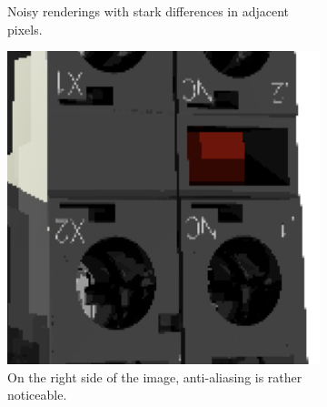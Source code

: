\begin{figure}[H]
\begin{subfigure}[t]{0.3\textwidth}
        \caption{Noisy renderings with stark differences in adjacent pixels.}
        \label{fig:rngNoiseArtifactsHighlightsGoodNoisy}
    \end{subfigure}
    \hspace*{2cm}
    \vfill
    \vspace*{0.5cm}
    \hspace*{2cm}
    \begin{subfigure}[t]{0.3\textwidth}
        \includegraphics[width=\textwidth]{resources/bad-seed-anti-aliasing.png}
        \caption{On the right side of the image, anti-aliasing is rather noticeable.}
        \label{fig:rngNoiseArtifactsHighlightsBadAnti}
    \end{subfigure}
    \hfill
    \begin{subfigure}[t]{0.3\textwidth}

\end{subfigure}
\end{figure}
